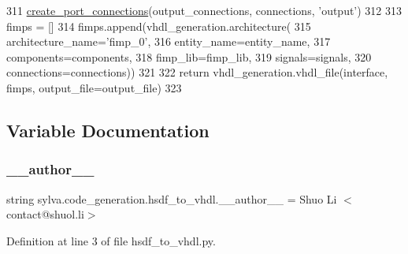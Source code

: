 \begin{DoxyCode}
311     \hyperlink{namespacesylva_1_1code__generation_1_1hsdf__to__vhdl_a32b4f40eadeb985a68674b401be7a1dc}{create\_port\_connections}(output\_connections, connections, \textcolor{stringliteral}{'output'})
312 
313     fimps = []
314     fimps.append(vhdl\_generation.architecture(
315         architecture\_name=\textcolor{stringliteral}{'fimp\_0'},
316         entity\_name=entity\_name,
317         components=components,
318         fimp\_lib=fimp\_lib,
319         signals=signals,
320         connections=connections))
321 
322     \textcolor{keywordflow}{return} vhdl\_generation.vhdl\_file(interface, fimps, output\_file=output\_file)
323 
\end{DoxyCode}


\subsection{Variable Documentation}
\mbox{\label{namespacesylva_1_1code__generation_1_1hsdf__to__vhdl_ae3bc1b6b45064dcd26934de897ca43ce}} 
\subsubsection{\texorpdfstring{\+\_\+\+\_\+author\+\_\+\+\_\+}{\_\_author\_\_}}
{\footnotesize\ttfamily string sylva.\+code\+\_\+generation.\+hsdf\+\_\+to\+\_\+vhdl.\+\_\+\+\_\+author\+\_\+\+\_\+ = \textquotesingle{}Shuo Li $<$contact@shuol.\+li$>$\textquotesingle{}\hspace{0.3cm}{\ttfamily [private]}}



Definition at line 3 of file hsdf\+\_\+to\+\_\+vhdl.\+py.

\mbox{\label{namespacesylva_1_1code__generation_1_1hsdf__to__vhdl_a75916eaf9006c0cce223480e45896984}} 
